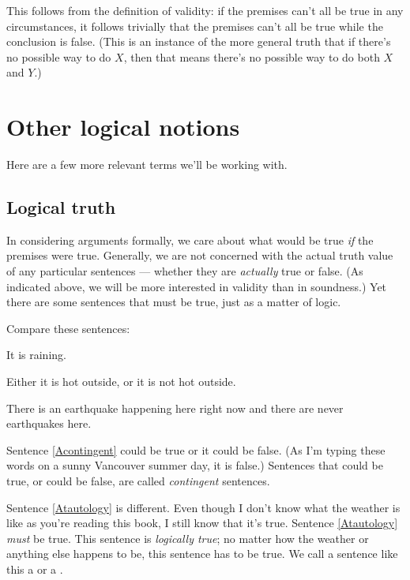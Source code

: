 
This follows from the definition of validity: if the premises can't all be true in any circumstances, it follows trivially that the premises can't all be true while the conclusion is false. (This is an instance of the more general truth that if there's no possible way to do $X$, then that means there's no possible way to do both $X$ and $Y$.)

\section{Other logical notions}

Here are a few more relevant terms we'll be working with.

\subsection{Logical truth}
\label{sec-tautologydef}
In considering arguments formally, we care about what would be true \emph{if} the premises were true. Generally, we are not concerned with the actual truth value of any particular sentences --- whether they are \emph{actually} true or false. (As indicated above, we will be more interested in validity than in soundness.) Yet there are some sentences that must be true, just as a matter of logic.

Compare these sentences:
\begin{earg}
\item[\ex{Acontingent}] It is raining.
\item[\ex{Atautology}] Either it is hot outside, or it is not hot outside.
\item[\ex{Acontradiction}] There is an earthquake happening here right now and there are never earthquakes here.
\end{earg}
Sentence \ref{Acontingent} could be true or it could be false. (As I'm typing these words on a sunny Vancouver summer day, it is false.) Sentences that could be true, or could be false, are called \emph{contingent} sentences.

Sentence \ref{Atautology} is different. Even though I don't know what the weather is like as you're reading this book, I still know that it's true. Sentence \ref{Atautology} \emph{must} be true. This sentence is \emph{logically true}; no matter how the weather or anything else happens to be, this sentence has to be true. We call a sentence like this a  or a .

